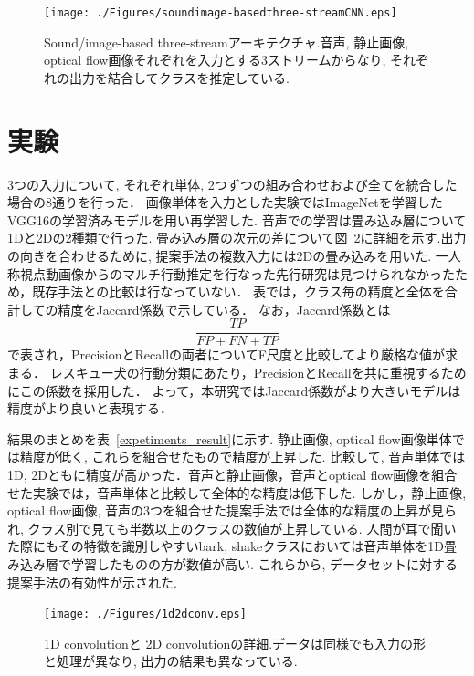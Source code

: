 \documentclass[MIRU,submit]{miru2019j}
\begin{document}
\begin{figure}[tb]
   \begin{center}
    \texttt{[image: ./Figures/soundimage-basedthree-streamCNN.eps]}
    \caption{Sound/image-based three-streamアーキテクチャ.音声, 静止画像, optical flow画像それぞれを入力とする3ストリームからなり, それぞれの出力を結合してクラスを推定している.}
    \label{sound3st}
   \end{center}
\end{figure}

\section{実験}

3つの入力について, それぞれ単体, 2つずつの組み合わせおよび全てを統合した場合の8通りを行った．%
画像単体を入力とした実験ではImageNetを学習したVGG16の学習済みモデルを用い再学習した.
音声での学習は畳み込み層について1Dと2Dの2種類で行った.
畳み込み層の次元の差について図~\ref{1d2dconv}に詳細を示す.出力の向きを合わせるために, 提案手法の複数入力には2Dの畳み込みを用いた.
一人称視点動画像からのマルチ行動推定を行なった先行研究は見つけられなかったため，既存手法との比較は行なっていない．
表では，クラス毎の精度と全体を合計しての精度をJaccard係数で示している．
なお，Jaccard係数とは$$\frac{TP}{FP+FN+TP}$$で表され，PrecisionとRecallの両者についてF尺度と比較してより厳格な値が求まる．
レスキュー犬の行動分類にあたり，PrecisionとRecallを共に重視するためにこの係数を採用した．
よって，本研究ではJaccard係数がより大きいモデルは精度がより良いと表現する．

結果のまとめを表~\ref{expetiments_result}に示す.
静止画像, optical flow画像単体では精度が低く, これらを組合せたもので精度が上昇した.
比較して, 音声単体では1D, 2Dともに精度が高かった．音声と静止画像，音声とoptical flow画像を組合せた実験では，音声単体と比較して全体的な精度は低下した.
しかし，静止画像, optical flow画像, 音声の3つを組合せた提案手法では全体的な精度の上昇が見られ, クラス別で見ても半数以上のクラスの数値が上昇している.
人間が耳で聞いた際にもその特徴を識別しやすいbark, shakeクラスにおいては音声単体を1D畳み込み層で学習したものの方が数値が高い.
これらから, データセットに対する提案手法の有効性が示された.

\begin{figure}[tb]
   \begin{center}
    \texttt{[image: ./Figures/1d2dconv.eps]}
    \caption{1D convolutionと 2D convolutionの詳細.データは同様でも入力の形と処理が異なり, 出力の結果も異なっている.}
    \label{1d2dconv}
   \end{center}
\end{figure}
\end{document}
